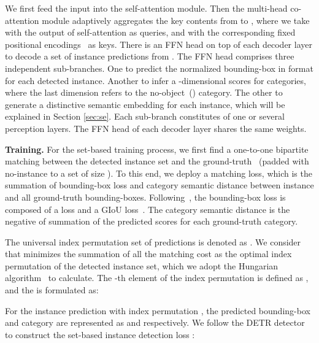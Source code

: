 \documentclass[final]{cvpr}
\begin{document}
We first feed the input into the self-attention module. Then the multi-head co-attention module adaptively aggregates the key contents from  to , where we take  with the output of self-attention as queries, and  with the corresponding fixed positional encodings~\cite{pmlr-v80-parmar18a} as keys. 
There is an FFN head on top of each decoder layer to decode a set of instance predictions from . The FFN head comprises three independent sub-branches. One to predict the normalized bounding-box in  format for each detected instance. Another to infer a -dimensional scores for  categories, where the last dimension refers to the no-object~() category. The other to generate a distinctive semantic embedding  for each instance, which will be explained in Section \ref{sec:se}. Each sub-branch constitutes of one or several perception layers. The FFN head of each decoder layer shares the same weights.

\vspace{0.5mm}\noindent\textbf{Training.} For the set-based training process, we first find a one-to-one bipartite matching between the detected instance set  and the ground-truth ~(padded with no-instance  to a set of size ). To this end, we deploy a matching loss, which is the summation of bounding-box loss and category semantic distance between instance and all ground-truth bounding-boxes. Following~\cite{carion2020endtoend}, the bounding-box loss is composed of a  loss and a GIoU loss~\cite{rezatofighi2019generalized}. The category semantic distance is the negative of summation of the predicted scores for each ground-truth category.

The universal index permutation set of  predictions is denoted as . We consider  that minimizes the summation of all the matching cost  as the optimal index permutation of the detected instance set, which we adopt the Hungarian algorithm~\cite{hungarian} to calculate. The -th element of the index permutation  is defined as , and the  is formulated as:
\vspace{-1mm}

For the instance prediction with index permutation , the predicted bounding-box and category are represented as  and  respectively. We follow the DETR detector~\cite{carion2020endtoend} to construct the set-based instance detection loss :
\end{document}
